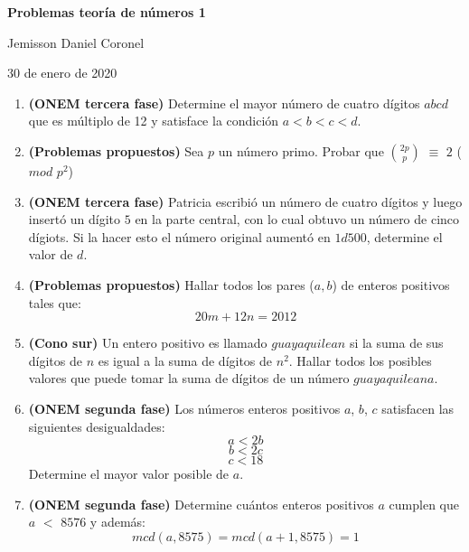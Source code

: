 \documentclass[10pt,a4 paper]{article}
\begin{document}
\chead{}

\begin{center}
\textbf{\Large{Problemas teor\'ia de n\'umeros 1}}
\end{center}

\begin{center}
Jemisson Daniel Coronel
\end{center}

\begin{center}
30 de enero de 2020
\end{center}
\vspace{9mm}
\begin{enumerate}

\item \textbf{(ONEM tercera fase)} Determine el mayor n\'umero de cuatro d\'igitos $abcd$ que es m\'ultiplo de 12 y satisface la condici\'on $a < b < c < d$. 

\item \textbf{(Problemas propuestos)} Sea $p$ un n\'umero primo. Probar que
$\binom{2p}{p}$ $\equiv$ $2$ ($mod$ $p^{2}$)

\item \textbf{(ONEM tercera fase)} Patricia escribi\'o un n\'umero de cuatro d\'igitos y luego insert\'o un d\'igito $5$ en la parte central, con lo cual obtuvo un n\'umero de cinco d\'igiots. Si la hacer esto el n\'umero original aument\'o en $1d500$, determine el valor de $d$.

\item \textbf{(Problemas propuestos)} Hallar todos los pares ($a, b$) de enteros positivos tales que:
$$20m + 12n = 2012$$

\item \textbf{(Cono sur)} Un entero positivo es llamado $guayaquilean$ si la suma de sus d\'igitos de $n$ es igual a la suma de d\'igitos de $n^{2}$. Hallar todos los posibles valores que puede tomar la suma de d\'igitos de un n\'umero $guayaquileana$.

\item \textbf{(ONEM segunda fase)} Los n\'umeros enteros positivos $a$, $b$, $c$ satisfacen las siguientes desigualdades:
$$a < 2b$$
$$b < 2c$$
$$c < 18$$
Determine el mayor valor posible de $a$.

\item \textbf{(ONEM segunda fase)} Determine cu\'antos enteros positivos $a$ cumplen que $a$ $<$ $8576$ y adem\'as:
$$mcd(a, 8575) = mcd(a + 1, 8575) = 1$$


\end{enumerate}
\end{document}
